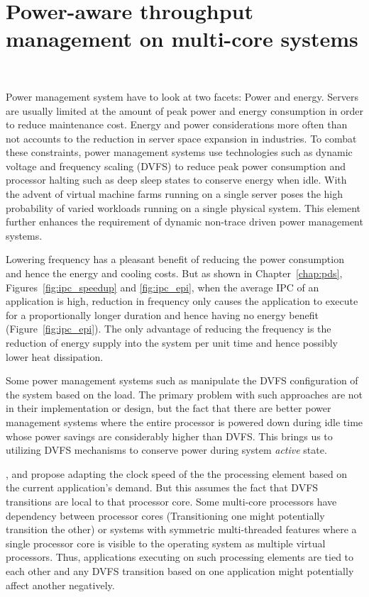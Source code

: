 \chapter{Power-aware throughput management on multi-core systems}~\label{chap:delta}

Power management system have to look at two facets: Power and energy. Servers are
usually limited at the amount of peak power and energy
consumption in order to reduce maintenance cost. Energy and power considerations more often than not accounts 
to the reduction in server space expansion in industries. To combat these constraints, power management systems
use technologies such as dynamic voltage and frequency scaling (DVFS) to reduce peak power
consumption and processor halting such as deep sleep states to conserve energy when idle.
With the advent of virtual machine farms running on a single
server poses the high probability of varied workloads running on a single physical system. 
This element further enhances the requirement of dynamic non-trace driven power management
systems.

Lowering frequency has a pleasant benefit of reducing the power consumption and hence
the energy and cooling costs. But as shown in Chapter~\ref{chap:pds}, Figures~\ref{fig:ipc_speedup} 
and \ref{fig:ipc_epi}, when the average IPC of an application is high, reduction in 
frequency only causes the application to execute for a proportionally longer duration and 
hence having no energy benefit (Figure~\ref{fig:ipc_epi}). The only advantage of reducing
the frequency is the reduction of energy supply into the system per unit time and hence
possibly lower heat dissipation. 

Some power management systems such as \cite{OnDemand} manipulate the DVFS configuration
of the system based on the load. The primary problem with such approaches are not in
their implementation or design, but the fact that there are better power management
systems where the entire processor is powered down during idle time whose power savings are considerably higher than DVFS. 
This brings us to utilizing DVFS mechanisms to conserve power during system \textit{active}
state. 

\cite{AnIntraTask}, \cite{LiveRuntime} and \cite{Phaseaware} propose adapting the clock speed of the the processing element based
on the current application's demand. But this assumes the fact that DVFS transitions
are local to that processor core. Some multi-core processors have dependency between 
processor cores (Transitioning one might potentially transition the other) or systems with 
symmetric multi-threaded features where a single processor
core is visible to the operating system as multiple virtual processors. Thus, applications
executing on such processing elements are tied to each other and any DVFS
transition based on one application might potentially affect another negatively. 

